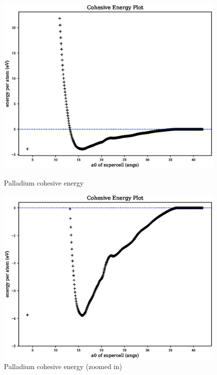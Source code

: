 \begin{figure}[ht] 
  \begin{minipage}[b]{0.4\linewidth}
    \centering
    \includegraphics[width=.9\linewidth]{chapters/results_potential_fitting/pot_fepd_fcc_1/pd_cohesive_energy.eps} 
    \caption{Palladium cohesive energy}  
    \label{fig:pdv1cohesive}
  \end{minipage}%
  \begin{minipage}[b]{0.4\linewidth}
    \centering
    \includegraphics[width=.9\linewidth]{chapters/results_potential_fitting/pot_fepd_fcc_1/pd_cohesive_energy_zoom.eps} 
    \caption{Palladium cohesive energy (zoomed in)}  
    \label{fig:pdv1cohesivezoom}
  \end{minipage}%
\end{figure}





